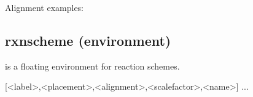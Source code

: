 \documentclass[toc=index,DIV10]{cnpkgdoc}
\begin{document}
Alignment examples:
\begin{beispiel}
 \begin{rxn}[center]
  \arrow{}{}
 \end{rxn}
 \begin{rxn}[right]
  \arrow{}{}
 \end{rxn}
 \begin{rxn}[left]
  \arrow{}{}
 \end{rxn}
\end{beispiel}

\subsection{rxnscheme (environment)}\label{ssec:rxnscheme}
 is a floating environment for reaction schemes.
\begin{beschreibung}
 [<label>,<placement>,<alignment>,<scalefactor>,<name>]{\unskip{} ...}
\end{beschreibung}
\end{document}

